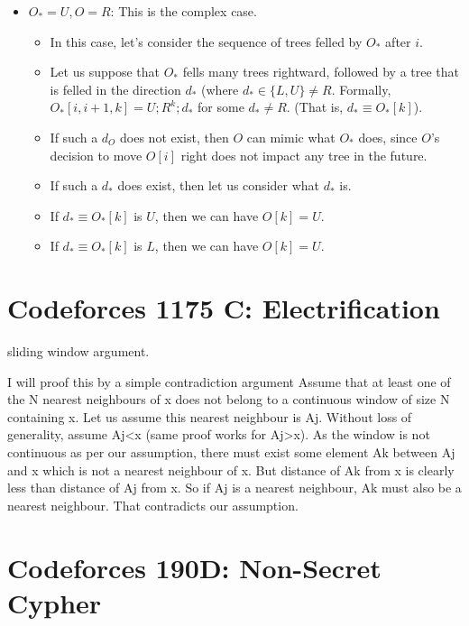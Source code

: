 \documentclass[14pt]{report}
\begin{document}
\begin{itemize}
\item $O_*=U, O=R$: This is the complex case.
    \begin{itemize}
            \item In this case, let's consider the sequence of trees felled by $O_*$ after $i$.
            \item Let us suppose that $O_*$ fells many trees rightward,
                followed by a tree that is felled in the direction $d_*$ (where
                $d_* \in \{L, U \} \neq R$.  Formally, $O_*[i, i+1, k] = U; R^k; d_*$ for
                some $d_* \neq R$. (That is, $d_* \equiv O_*[k]$).
            \item If such a $d_O$ does not exist, then $O$ can
                mimic what $O_*$ does, since $O$'s decision to move $O[i]$ right does not impact any tree in the future.
            \item If such a $d_*$ does exist, then let us consider what $d_*$ is.
            \item If $d_* \equiv O_*[k]$ is $U$, then we can have $O[k] = U$.
            \item If $d_* \equiv O_*[k]$ is $L$, then we can have $O[k] = U$.
    \end{itemize}
\end{itemize}

\section{Codeforces  1175 C: Electrification}

sliding window argument.

I will proof this by a simple contradiction argument Assume that at least one of the N nearest neighbours of x does not belong to a continuous window of size N containing x. Let us assume this nearest neighbour is Aj. Without loss of generality, assume Aj<x (same proof works for Aj>x). As the window is not continuous as per our assumption, there must exist some element Ak between Aj and x which is not a nearest neighbour of x. But distance of Ak from x is clearly less than distance of Aj from x. So if Aj is a nearest neighbour, Ak must also be a nearest neighbour. That contradicts our assumption.




\section{Codeforces 190D: Non-Secret Cypher}
\end{document}
